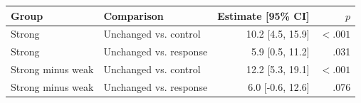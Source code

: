 \begin{tabular}{llrr}
\toprule
Group & Comparison & Estimate [95\% CI] & $p$ \\
\midrule
Strong & Unchanged vs. control & 10.2 [4.5, 15.9] & $<.001$ \\
Strong & Unchanged vs. response & 5.9 [0.5, 11.2] & .031 \\
Strong minus weak & Unchanged vs. control & 12.2 [5.3, 19.1] & $<.001$ \\
Strong minus weak & Unchanged vs. response & 6.0 [-0.6, 12.6] & .076 \\
\bottomrule
\end{tabular}
